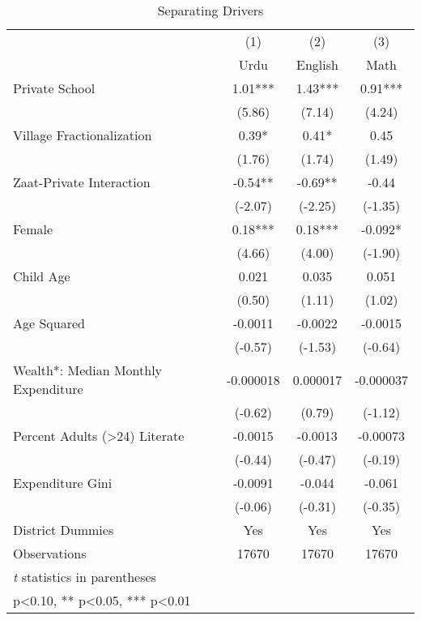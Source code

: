\begin{table}[htbp]\centering
\def\sym#1{\ifmmode^{#1}\else\(^{#1}\)\fi}
\caption{Separating Drivers}
\begin{tabular}{l*{3}{c}}
\toprule
                &\multicolumn{1}{c}{(1)}&\multicolumn{1}{c}{(2)}&\multicolumn{1}{c}{(3)}\\
                &\multicolumn{1}{c}{Urdu}&\multicolumn{1}{c}{English}&\multicolumn{1}{c}{Math}\\
\midrule
Private School  &     1.01***&     1.43***&     0.91***\\
                &   (5.86)   &   (7.14)   &   (4.24)   \\
Village Fractionalization&     0.39*  &     0.41*  &     0.45   \\
                &   (1.76)   &   (1.74)   &   (1.49)   \\
Zaat-Private Interaction&    -0.54** &    -0.69** &    -0.44   \\
                &  (-2.07)   &  (-2.25)   &  (-1.35)   \\
Female          &     0.18***&     0.18***&   -0.092*  \\
                &   (4.66)   &   (4.00)   &  (-1.90)   \\
Child Age       &    0.021   &    0.035   &    0.051   \\
                &   (0.50)   &   (1.11)   &   (1.02)   \\
Age Squared     &  -0.0011   &  -0.0022   &  -0.0015   \\
                &  (-0.57)   &  (-1.53)   &  (-0.64)   \\
Wealth*: Median Monthly Expenditure&-0.000018   & 0.000017   &-0.000037   \\
                &  (-0.62)   &   (0.79)   &  (-1.12)   \\
Percent Adults (>24) Literate&  -0.0015   &  -0.0013   & -0.00073   \\
                &  (-0.44)   &  (-0.47)   &  (-0.19)   \\
Expenditure Gini&  -0.0091   &   -0.044   &   -0.061   \\
                &  (-0.06)   &  (-0.31)   &  (-0.35)   \\
District Dummies&      Yes   &      Yes   &      Yes   \\
\midrule
Observations    &    17670   &    17670   &    17670   \\
\bottomrule
\multicolumn{4}{l}{\footnotesize \textit{t} statistics in parentheses}\\
\multicolumn{4}{l}{\footnotesize * p<0.10, ** p<0.05, *** p<0.01}\\
\end{tabular}
\end{table}
